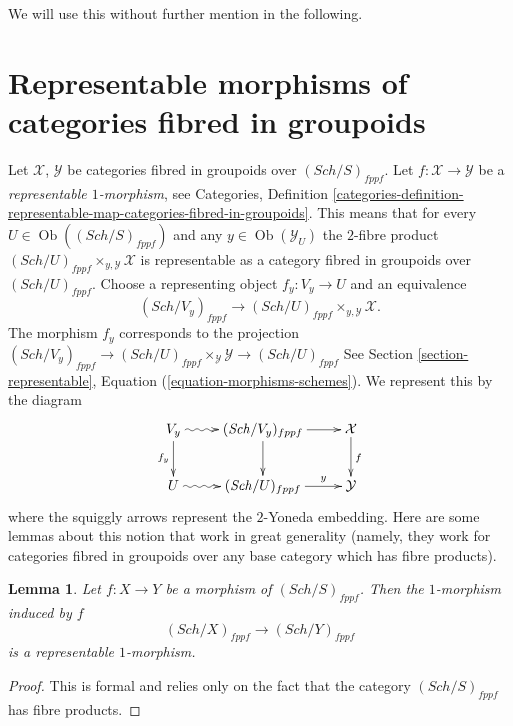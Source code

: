 \documentclass{stacks-project}
\theoremstyle{plain}
\newtheorem{lemma}[subsection]{Lemma}
\theoremstyle{definition}
\theoremstyle{remark}
\numberwithin{equation}{subsection}
\def\Sch{\mathit{Sch}}
\def\Ob{\mathop{\mathrm{Ob}}\nolimits}
\begin{document}
\medskip\noindent
We will use this without further mention in the following.





\section{Representable morphisms of categories fibred in groupoids}
\label{section-representable-morphism}


\noindent
Let $\mathcal{X}$, $\mathcal{Y}$ be categories fibred in groupoids
over $(\Sch/S)_{fppf}$. Let $f : \mathcal{X} \to \mathcal{Y}$
be a {\it representable $1$-morphism}, see
Categories, Definition
\ref{categories-definition-representable-map-categories-fibred-in-groupoids}.
This means that for every $U \in \Ob((\Sch/S)_{fppf})$ and
any $y \in \Ob(\mathcal{Y}_U)$ the $2$-fibre product
$(\Sch/U)_{fppf} \times_{y, \mathcal{Y}} \mathcal{X}$
is representable as a category fibred in groupoids over
$(\Sch/U)_{fppf}$. Choose a representing object $f_y : V_y \to U$
and an equivalence
$$
(\Sch/V_y)_{fppf}
\longrightarrow
(\Sch/U)_{fppf} \times_{y, \mathcal{Y}} \mathcal{X}.
$$
The morphism $f_y$ corresponds to the projection
$(\Sch/V_y)_{fppf} \to
(\Sch/U)_{fppf} \times_\mathcal{Y} \mathcal{Y}
\to (\Sch/U)_{fppf}$
See Section \ref{section-representable},
Equation (\ref{equation-morphisms-schemes}). We represent this by the diagram
\begin{equation}
\label{equation-representable}
\vcenter{
\xymatrix{
V_y \ar@{~>}[r] \ar[d]_{f_y} &
(\Sch/V_y)_{fppf} \ar[d] \ar[r] &
\mathcal{X} \ar[d]^f \\
U \ar@{~>}[r] &
(\Sch/U)_{fppf} \ar[r]^-y &
\mathcal{Y}
}
}
\end{equation}
where the squiggly arrows represent the $2$-Yoneda embedding.
Here are some lemmas about this notion that work in great generality
(namely, they work for categories fibred in groupoids over any
base category which has fibre products).

\begin{lemma}
\label{lemma-morphism-schemes-gives-representable-transformation}
Let $f : X \to Y$ be a morphism of $(\Sch/S)_{fppf}$.
Then the $1$-morphism induced by $f$
$$
(\Sch/X)_{fppf} \longrightarrow (\Sch/Y)_{fppf}
$$
is a representable $1$-morphism.
\end{lemma}

\begin{proof}
This is formal and relies only on the fact that
the category $(\Sch/S)_{fppf}$ has fibre products.
\end{proof}
\end{document}

